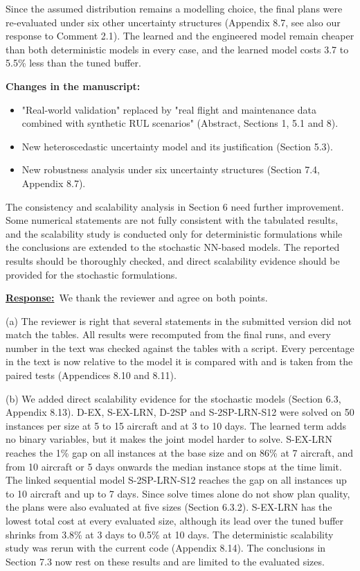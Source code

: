 \documentclass{article}
\newcommand{\response}{\vspace{0.1cm}\noindent\underline{\textbf{Response:}}\ }
\newcommand{\changes}{\vspace{0.1cm}\noindent\textbf{Changes in the manuscript:}}
\begin{document}
Since the assumed distribution remains a modelling choice, the final plans were re-evaluated under six other uncertainty structures (Appendix 8.7, see also our response to Comment 2.1). The learned and the engineered model remain cheaper than both deterministic models in every case, and the learned model costs 3.7 to 5.5\% less than the tuned buffer.

\changes
\begin{itemize}[nosep]
\item "Real-world validation" replaced by "real flight and maintenance data combined with synthetic RUL scenarios" (Abstract, Sections 1, 5.1 and 8).
\item New heteroscedastic uncertainty model and its justification (Section 5.3).
\item New robustness analysis under six uncertainty structures (Section 7.4, Appendix 8.7).
\end{itemize}

\begin{cmt}{}{}
The consistency and scalability analysis in Section 6 need further improvement. Some numerical statements are not fully consistent with the tabulated results, and the scalability study is conducted only for deterministic formulations while the conclusions are extended to the stochastic NN-based models. The reported results should be thoroughly checked, and direct scalability evidence should be provided for the stochastic formulations.
\end{cmt}

\response We thank the reviewer and agree on both points.

(a) The reviewer is right that several statements in the submitted version did not match the tables. All results were recomputed from the final runs, and every number in the text was checked against the tables with a script. Every percentage in the text is now relative to the model it is compared with and is taken from the paired tests (Appendices 8.10 and 8.11).

(b) We added direct scalability evidence for the stochastic models (Section 6.3, Appendix 8.13). D-EX, S-EX-LRN, D-2SP and S-2SP-LRN-S12 were solved on 50 instances per size at 5 to 15 aircraft and at 3 to 10 days. The learned term adds no binary variables, but it makes the joint model harder to solve. S-EX-LRN reaches the 1\% gap on all instances at the base size and on 86\% at 7 aircraft, and from 10 aircraft or 5 days onwards the median instance stops at the time limit. The linked sequential model S-2SP-LRN-S12 reaches the gap on all instances up to 10 aircraft and up to 7 days. Since solve times alone do not show plan quality, the plans were also evaluated at five sizes (Section 6.3.2). S-EX-LRN has the lowest total cost at every evaluated size, although its lead over the tuned buffer shrinks from 3.8\% at 3 days to 0.5\% at 10 days. The deterministic scalability study was rerun with the current code (Appendix 8.14). The conclusions in Section 7.3 now rest on these results and are limited to the evaluated sizes.
\end{document}

